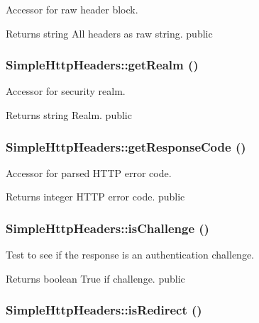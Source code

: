 \label{class_simple_http_headers_ae0349d693484f2c97186736c2ef07476}
Accessor for raw header block. \begin{DoxyReturn}{Returns}
string All headers as raw string.  public 
\end{DoxyReturn}
\hypertarget{class_simple_http_headers_a62ef0082bc73a8947d66825ab3670819}{
\subsubsection[{getRealm}]{\setlength{\rightskip}{0pt plus 5cm}SimpleHttpHeaders::getRealm ()}}
\label{class_simple_http_headers_a62ef0082bc73a8947d66825ab3670819}
Accessor for security realm. \begin{DoxyReturn}{Returns}
string Realm.  public 
\end{DoxyReturn}
\hypertarget{class_simple_http_headers_a58b70d11049e75473cacb60184a0d17a}{
\subsubsection[{getResponseCode}]{\setlength{\rightskip}{0pt plus 5cm}SimpleHttpHeaders::getResponseCode ()}}
\label{class_simple_http_headers_a58b70d11049e75473cacb60184a0d17a}
Accessor for parsed HTTP error code. \begin{DoxyReturn}{Returns}
integer HTTP error code.  public 
\end{DoxyReturn}
\hypertarget{class_simple_http_headers_a043268e9773ce05afc09292f9cbfd0c3}{
\subsubsection[{isChallenge}]{\setlength{\rightskip}{0pt plus 5cm}SimpleHttpHeaders::isChallenge ()}}
\label{class_simple_http_headers_a043268e9773ce05afc09292f9cbfd0c3}
Test to see if the response is an authentication challenge. \begin{DoxyReturn}{Returns}
boolean True if challenge.  public 
\end{DoxyReturn}
\hypertarget{class_simple_http_headers_a23809f4cdd1c076084b41b254f4e7408}{
\subsubsection[{isRedirect}]{\setlength{\rightskip}{0pt plus 5cm}SimpleHttpHeaders::isRedirect ()}}
